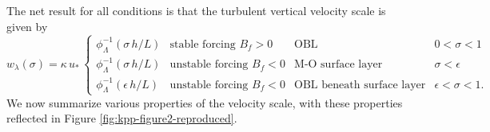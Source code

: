 The net result for all conditions is that the turbulent vertical
velocity scale is given by
\begin{equation}
  w_{\lambda}(\sigma)  = \kappa \, u_{*} \, \left\{
 \begin{array}{llll}
   \phi^{-1}_{\Lambda}(\sigma \, h / L)   
  &\mbox{stable forcing $B_{f} > 0$} & \mbox{OBL}
  &\mbox{$0 < \sigma < 1$}
\\
  \phi^{-1}_{\Lambda}(\sigma \, h / L)   
  &\mbox{unstable forcing $B_{f} < 0$} &\mbox{M-O surface layer}
  &\mbox{$\sigma <  \epsilon$}
\\
  \phi^{-1}_{\Lambda}(\epsilon \, h / L)   
 &\mbox{unstable forcing $B_{f} < 0$} &\mbox{OBL beneath surface layer}
 &\mbox{$\epsilon < \sigma < 1$.}
\end{array} 
 \right.
\label{eq:wlambda-general}
\end{equation}
We now summarize various properties of the velocity scale, with these
properties reflected in Figure \ref{fig:kpp-figure2-reproduced}.
